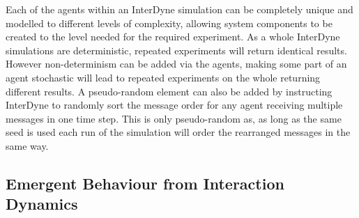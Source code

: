 \documentclass{article}
\begin{document}
Each of the agents within an InterDyne simulation can be completely unique and modelled to different levels of complexity, allowing system components to be created to the level needed for the required experiment. As a whole InterDyne simulations are deterministic, repeated experiments will return identical results. However non-determinism can be added via the agents, making some part of an agent stochastic will lead to repeated experiments on the whole returning different results. A pseudo-random element can also be added by instructing InterDyne to randomly sort the message order for any agent receiving multiple messages in one time step. This is only pseudo-random as, as long as the same seed is used each run of the simulation will order the rearranged messages in the same way.   




\subsection{Emergent Behaviour from Interaction Dynamics}

\end{document}
